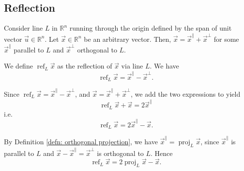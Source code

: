 \documentclass[]{book}
\DeclareMathOperator{\proj}{proj}
\DeclareMathOperator{\vecref}{ref}
\newcommand{\R}{\ensuremath{\mathbb{R}}}
\begin{document}
\subsection{Reflection}
Consider line $L$ in $\R^n$ running through the origin defined by the span of unit vector $\vec{u} \in \R^n$. Let $\vec{x} \in \R^n$ be an arbitrary vector. Then, $\vec{x} = \vec{x}^{\parallel} + \vec{x}^{\perp}$ for some $\vec{x}^{\parallel}$ parallel to $L$ and $\vec{x}^{\perp}$ orthogonal to $L$.
\begin{definition}[reflection]
    We define $\vecref_L \vec{x}$ as the reflection of $\vec{x}$ via line $L$. We have \[\vecref_L \vec{x} = \vec{x}^{\parallel} - \vec{x}^{\perp}.\]
\end{definition}
Since $\vecref_L \vec{x} = \vec{x}^{\parallel} - \vec{x}^{\perp}$, and $\vec{x} = \vec{x}^{\parallel} + \vec{x}^{\perp}$, we add the two expressions to yield \[\vecref_L \vec{x} + \vec{x} = 2\vec{x}^{\parallel}\] i.e. \[\vecref_L \vec{x} = 2\vec{x}^{\parallel} - \vec{x}.\]

By Definition \ref{defn: orthogonal projection}, we have $\vec{x}^{\parallel} = \proj_L \vec{x}$, since $\vec{x}^{\parallel}$ is parallel to $L$ and $\vec{x} - \vec{x}^{\parallel} = \vec{x}^{\perp}$ is orthogonal to $L$. Hence
\[\vecref_L \vec{x} = 2\proj_L \vec{x} - \vec{x}.\]
\end{document}
